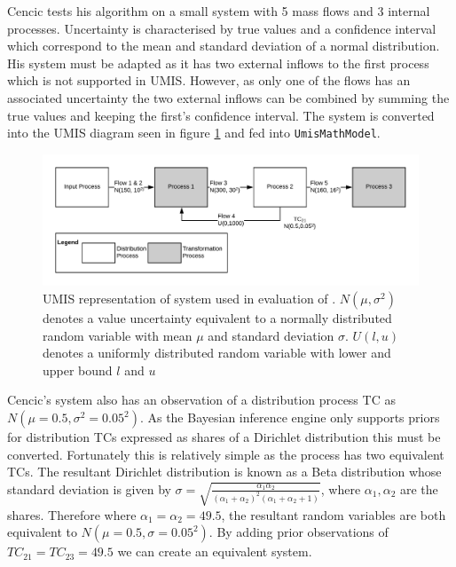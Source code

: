 \documentclass[ %
                    author={Tom Jager},
                supervisor={Dr. Daniel Schien},
                    degree={MEng},
                     title={A Bayesian Inference Engine for Calibrating Uncertainty over UMIS Structured MFA Systems},
                  subtitle={},
                      type={research},
                      year={2019} ]{dissertation}
\begin{document}
Cencic tests his algorithm on a small system with 5 mass flows and 3 internal processes. Uncertainty is characterised by true values and a confidence interval which correspond to the mean and standard deviation of a normal distribution. His system must be adapted as it has two external inflows to the first process which is not supported in UMIS. However, as only one of the flows has an associated uncertainty the two external inflows can be combined by summing the true values and keeping the first's confidence interval. The system is converted into the UMIS diagram seen in figure \ref{fig:cencic_system} and fed into \texttt{UmisMathModel}.

\begin{figure}[h!]
    \centering
    \includegraphics[width=\linewidth]{images/cencic_system.png}
    \caption{UMIS representation of system used in evaluation of \cite{cencic2016nonlinear}. $N(\mu, \sigma^2)$ denotes a value uncertainty equivalent to a normally distributed random variable with mean $\mu$ and standard deviation $\sigma$. $U(l, u)$ denotes a uniformly distributed random variable with lower and upper bound $l$ and $u$}
    \label{fig:cencic_system}
\end{figure}

Cencic's system also has an observation of a distribution process TC as $N(\mu=0.5,\sigma^2=0.05^2)$. As the Bayesian inference engine only supports priors for distribution TCs expressed as shares of a Dirichlet distribution this must be converted. Fortunately this is relatively simple as the process has two equivalent TCs. The resultant Dirichlet distribution is known as a Beta distribution whose standard deviation is given by $\sigma= \sqrt{\frac{\alpha_1\alpha_2}{(\alpha_1 + \alpha_2)^2(\alpha_1+\alpha_2 + 1)}}$, where $\alpha_1, \alpha_2$ are the shares. Therefore where $\alpha_1 = \alpha_2 = 49.5$, the resultant random variables are both equivalent to $N(\mu=0.5,\sigma=0.05^2)$. By adding prior observations of $TC_{21} = TC_{23} = 49.5$ we can create an equivalent system.

\end{document}
